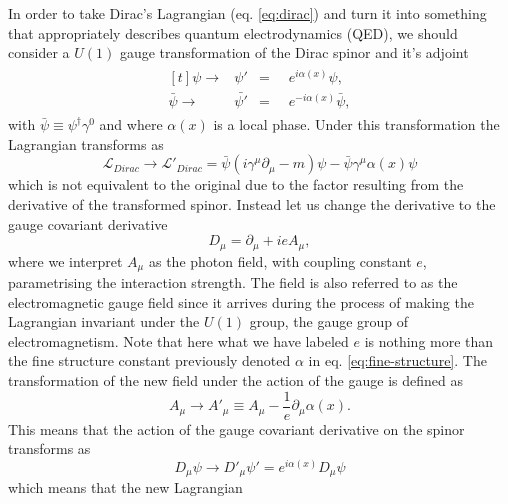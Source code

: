 In order to take Dirac's Lagrangian (eq. \ref{eq:dirac}) and turn it into
something that appropriately describes quantum electrodynamics (QED), we should
consider a $U(1)$ gauge transformation of the Dirac spinor and it's adjoint
\begin{equation}
  \label{eq:u1trans}
  \begin{split}
    \begin{aligned}[t] \psi \rightarrow &\psi' &=&\;\; e^{i\alpha(x)}\psi,\\
\bar{\psi} \rightarrow &\bar{\psi'} &=&\;\; e^{-i\alpha(x)}\bar{\psi},
    \end{aligned}
  \end{split}
\end{equation} with $\bar{\psi} \equiv \psi^{\dagger}\gamma^{0}$ and where
$\alpha(x)$ is a local phase. Under this transformation the Lagrangian
transforms as
\begin{equation}
  \label{eq:diracu1} \mathcal{L}_{Dirac} \rightarrow \mathcal{L}'_{Dirac} =
\bar{\psi}(i\gamma^{\mu}\partial_{\mu} - m)\psi -
\bar{\psi}\gamma^{\mu}\alpha(x)\psi
\end{equation} which is not equivalent to the original due to the factor
resulting from the derivative of the transformed spinor. Instead let us change
the derivative to the gauge covariant derivative
\begin{equation}
  \label{eq:covariant-em} D_\mu = \partial_{\mu} + ieA_{\mu},
\end{equation} where we interpret $A_{\mu}$ as the photon field, with coupling
constant $e$, parametrising the interaction strength. The field is also referred
to as the electromagnetic gauge field since it arrives during the process of
making the Lagrangian invariant under the $U(1)$ group, the gauge group of
electromagnetism. Note that here what we have labeled $e$ is nothing more than
the fine structure constant previously denoted $\alpha$ in eq.
\ref{eq:fine-structure}. The transformation of the new field under the action of
the gauge is defined as
\begin{equation}
  \label{eq:em-field-gauge} A_{\mu} \rightarrow A'_{\mu} \equiv A_{\mu} -
\frac{1}{e}\partial_{\mu}\alpha(x).
\end{equation} This means that the action of the gauge covariant derivative on
the spinor transforms as
\begin{equation}
  \label{eq:cov-trans} D_{\mu}\psi \rightarrow D'_{\mu}\psi' =
e^{i\alpha(x)}D_{\mu}\psi
\end{equation} which means that the new Lagrangian
